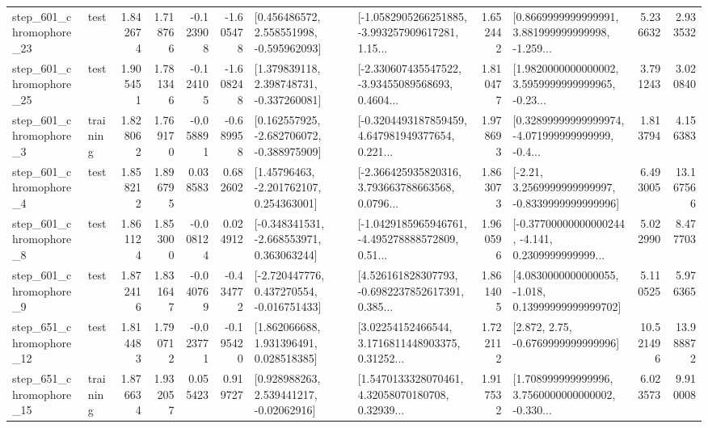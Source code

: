 \begin{tabular}{llrrrrllrlrr}
  step\_601\_chromophore\_23 &      test &      1.842674 &    1.718766 &     -0.123908 & -1.605478 &    [0.456486572, 2.558551998, -0.595962093] &  [-1.0582905266251885, -3.993257909617281, 1.15... &       1.652442 &  [0.8669999999999991, 3.881999999999998, -1.259... &            5.236632 &          2.933532 \\
  step\_601\_chromophore\_25 &      test &      1.905451 &    1.781346 &     -0.124105 & -1.608248 &    [1.379839118, 2.398748731, -0.337260081] &  [-2.330607435547522, -3.93455089568693, 0.4604... &       1.810477 &  [1.9820000000000002, 3.5959999999999965, -0.23... &            3.791243 &          3.020840 \\
   step\_601\_chromophore\_3 &  training &      1.828062 &    1.769170 &     -0.058891 & -0.689958 &   [0.162557925, -2.682706072, -0.388975909] &  [-0.3204493187859459, 4.647981949377654, 0.221... &       1.978693 &  [0.32899999999999974, -4.071999999999999, -0.4... &            1.813794 &          4.156383 \\
   step\_601\_chromophore\_4 &      test &      1.858212 &    1.896795 &      0.038583 &  0.682602 &     [1.45796463, -2.201762107, 0.254363001] &  [-2.366425935820316, 3.793663788663568, 0.0796... &       1.863073 &   [-2.21, 3.2569999999999997, -0.8339999999999996] &            6.493005 &         13.167566 \\
   step\_601\_chromophore\_8 &      test &      1.861124 &    1.853000 &     -0.008124 &  0.024912 &   [-0.348341531, -2.668553971, 0.363063244] &  [-1.0429185965946761, -4.495278888572809, 0.51... &       1.960596 &  [-0.37700000000000244, -4.141, 0.2309999999999... &            5.022990 &          8.477703 \\
   step\_601\_chromophore\_9 &      test &      1.872416 &    1.831647 &     -0.040769 & -0.434772 &   [-2.720447776, 0.437270554, -0.016751433] &  [4.526161828307793, -0.6982237852617391, 0.385... &       1.861405 &  [4.0830000000000055, -1.018, 0.13999999999999702] &            5.110525 &          5.976365 \\
  step\_651\_chromophore\_12 &      test &      1.814483 &    1.790712 &     -0.023771 & -0.195420 &     [1.862066688, 1.931396491, 0.028518385] &  [3.02254152466544, 3.1716811448903375, 0.31252... &       1.722112 &                 [2.872, 2.75, -0.6769999999999996] &           10.521496 &         13.988872 \\
  step\_651\_chromophore\_15 &  training &      1.876634 &    1.932057 &      0.055423 &  0.919727 &     [0.928988263, 2.539441217, -0.02062916] &  [1.5470133328070461, 4.32058070180708, 0.32939... &       1.917532 &  [1.708999999999996, 3.7560000000000002, -0.330... &            6.023573 &          9.910008 \\

\end{tabular}
